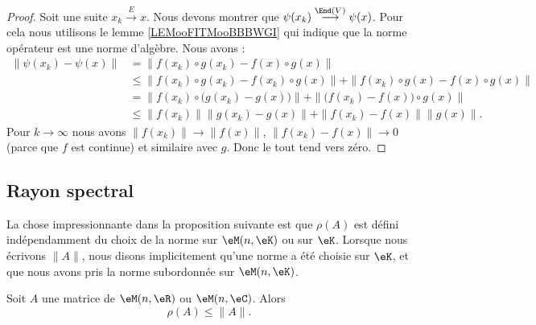 \begin{proof}
	Soit une suite \( x_k\stackrel{E}{\longrightarrow}x\). Nous devons montrer que \( \psi(x_k)\stackrel{\End(V)}{\longrightarrow}\psi(x)\). Pour cela nous utilisons le lemme \ref{LEMooFITMooBBBWGI} qui indique que la norme opérateur est une norme d'algèbre. Nous avons :
	\begin{subequations}
		\begin{align}
			\| \psi(x_k)-\psi(x) \| & =\| f(x_k)\circ g(x_k)-f(x)\circ g(x) \|                                              \\
			                        & \leq \| f(x_k)\circ g(x_k)-f(x_k)\circ g(x) \|+\| f(x_k)\circ g(x)-f(x)\circ g(x) \|  \\
			                        & =\| f(x_k)\circ \big( g(x_k)-g(x) \big) \|+\| \big(f(x_k)-f(x)\big)\circ g(x) \|      \\
			                        & \leq \| f(x_k) \|\| g(x_k)-g(x) \|+\| f(x_k)-f(x) \|\| g(x) \|.
		\end{align}
	\end{subequations}
	Pour \( k\to \infty\) nous avons \( \| f(x_k) \| \to \| f(x) \| \), \( \| f(x_k)-f(x) \|\to 0\) (parce que \( f\) est continue) et similaire avec \( g\). Donc le tout tend vers zéro.
\end{proof}

\subsection{Rayon spectral}

La chose impressionnante dans la proposition suivante est que \( \rho(A)\) est défini indépendamment du choix de la norme sur \( \eM(n,\eK)\) ou sur \( \eK\). Lorsque nous écrivons \( \| A \|\), nous disons implicitement qu'une norme a été choisie sur \( \eK\), et que nous avons pris la norme subordonnée sur \( \eM(n,\eK)\).
\begin{proposition}        \label{PROPooWZJBooTPLSZp}
	Soit \( A\) une matrice de \( \eM(n,\eR)\) ou \( \eM(n,\eC)\). Alors
	\begin{equation}
		\rho(A)\leq \| A \|.
	\end{equation}
\end{proposition}

